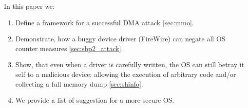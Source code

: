 \begin{comment}
\textcolor{teal}{V1:\newline
The thunderclap project \cite{thunder} has exposed weakness in multiple OSs. The project was able to "\emph{reveal endemic vulnerability in the presence of a more sophisticated attacker despite explicit use of the IOMMU to limit I/O attacks.}". Most of these vulnerabilities were due to clear disregard to good DMA hygiene; and resulted in fixes in these exposed OSs. In most cases all the ingredients for a DMA attack were immediately available, to the device. In this work, we present multiple concrete attacks, where the device has to work harder to lunch an attack. The sole bastion of security seemed to be the Linux Kernel. Thus, this work focuses on the Linux network stack that was declared to be mostly secure from DMA attacks, by the Thunderclap project. To date and to the best of our knowledge, no complete DMA attacks were demonstrated against IOMMU enabled Linux Kernel. It is important to disclose that the Thunderclap project, has claimed an attack on a Linux network devices, but the description was incomplete and the attack, as described, was infeasible. We actually use it as an example in section \ref{sec:mmo}, when talking about the necessary ingredients for a successful DMA attack. In this work, we attempt to show, that while each security hole can be plugged, when reported; DMA related risks are inevitable until sub-page vulnerability is systematically eliminated.}
\end{comment}
\newline
In this paper we:
\begin{enumerate}
    \item Define a framework for a successful DMA attack \ref{sec:mmo}. 
    \item Demonstrate, how a buggy device driver (FireWire) can negate all OS counter measures \ref{sec:sbp2_attack}.
    \item Show, that even when a driver is carefully written, the OS can still betray it self to a malicious device; allowing the execution of arbitrary code and/or collecting a full memory dump \ref{sec:shinfo}.
    \item We provide a list of suggestion for a more secure OS.
\end{enumerate}
 











\appendix





